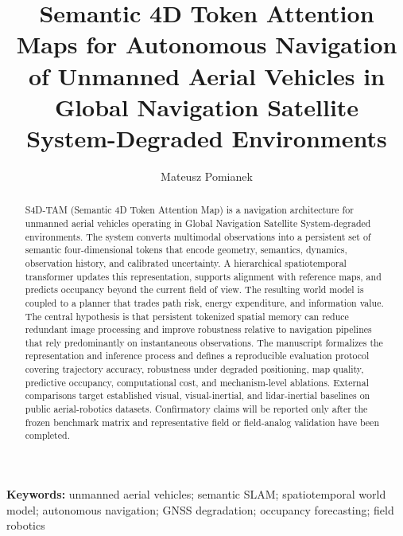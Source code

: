 \documentclass[12pt,a4paper]{article}
\title{\textbf{Semantic 4D Token Attention Maps for Autonomous Navigation of Unmanned Aerial Vehicles in Global Navigation Satellite System-Degraded Environments}}
\author{Mateusz Pomianek}
\affil{Department of Computer and Control Engineering, Rzeszów University of Technology, Poland\\
\texttt{m.pomianek@prz.edu.pl}}
\date{}
\begin{document}
\maketitle

\begin{abstract}
S4D-TAM (Semantic 4D Token Attention Map) is a navigation architecture for unmanned aerial vehicles operating in Global Navigation Satellite System-degraded environments. The system converts multimodal observations into a persistent set of semantic four-dimensional tokens that encode geometry, semantics, dynamics, observation history, and calibrated uncertainty. A hierarchical spatiotemporal transformer updates this representation, supports alignment with reference maps, and predicts occupancy beyond the current field of view. The resulting world model is coupled to a planner that trades path risk, energy expenditure, and information value. The central hypothesis is that persistent tokenized spatial memory can reduce redundant image processing and improve robustness relative to navigation pipelines that rely predominantly on instantaneous observations. The manuscript formalizes the representation and inference process and defines a reproducible evaluation protocol covering trajectory accuracy, robustness under degraded positioning, map quality, predictive occupancy, computational cost, and mechanism-level ablations. External comparisons target established visual, visual-inertial, and lidar-inertial baselines on public aerial-robotics datasets. Confirmatory claims will be reported only after the frozen benchmark matrix and representative field or field-analog validation have been completed.
\end{abstract}

\noindent\textbf{Keywords:} unmanned aerial vehicles; semantic SLAM; spatiotemporal world model; autonomous navigation; GNSS degradation; occupancy forecasting; field robotics















\end{document}
